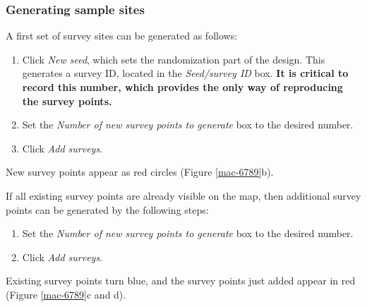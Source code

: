 \documentclass[a4paper,11pt]{article} %
\begin{document}

\subsubsection{Generating sample sites}
A first set of survey sites can be generated as follows:
\begin{enumerate}
\item Click \textit{New seed}, which sets the randomization part of the design. This generates a survey ID, located in the \textit{Seed/survey ID} box. {\bf It is critical to record this number, which provides the only way of reproducing the survey points.}
\item Set the \textit{Number of new survey points to generate} box to the desired number.
\item Click \textit{Add surveys}. 
\end{enumerate}
New survey points appear as red circles (Figure \ref{mac-6789}b).


If all existing survey points are already visible on the map, then additional survey points can be generated by the following steps:
\begin{enumerate}
\item Set the \textit{Number of new survey points to generate} box to the desired number.
\item Click \textit{Add surveys}. 
\end{enumerate}
Existing survey points turn blue, and the survey points just added appear in red  (Figure \ref{mac-6789}c and d).
\end{document}
